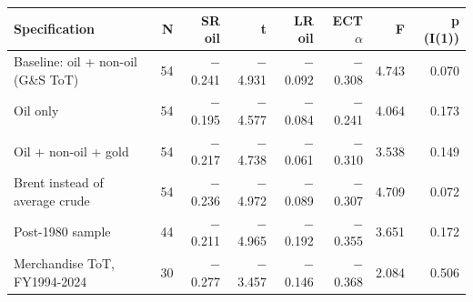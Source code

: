 \begin{tabular}{lrrrrrrr}
\toprule
Specification & N & SR oil & t & LR oil & ECT $\alpha$ & F & p (I(1)) \\
\midrule
Baseline: oil + non-oil (G\&S ToT) & 54 & $-$0.241 & $-$4.931 & $-$0.092 & $-$0.308 & 4.743 & 0.070 \\
Oil only & 54 & $-$0.195 & $-$4.577 & $-$0.084 & $-$0.241 & 4.064 & 0.173 \\
Oil + non-oil + gold & 54 & $-$0.217 & $-$4.738 & $-$0.061 & $-$0.310 & 3.538 & 0.149 \\
Brent instead of average crude & 54 & $-$0.236 & $-$4.972 & $-$0.089 & $-$0.307 & 4.709 & 0.072 \\
Post-1980 sample & 44 & $-$0.211 & $-$4.965 & $-$0.192 & $-$0.355 & 3.651 & 0.172 \\
Merchandise ToT, FY1994-2024 & 30 & $-$0.277 & $-$3.457 & $-$0.146 & $-$0.368 & 2.084 & 0.506 \\
\bottomrule
\end{tabular}

